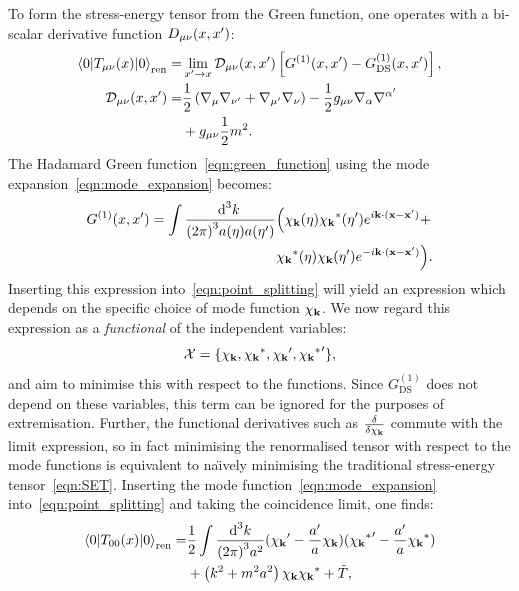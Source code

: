 To form the stress-energy tensor from the Green function, one operates with a bi-scalar derivative function $D_{\mu\nu}(x,\prm{x})$:
\begin{align}
  \bracket{0}{T_{\mu\nu}(x)}{0}_\mathrm{ren} =& \lim\limits_{\prm{x}\to x} \mathcal{D}_{\mu\nu}(x,\prm{x}) \left[ G^{(1)}(x,\prm{x}) - G^{(1)}_\mathrm{DS}(x,\prm{x}) \right],
  \label{eqn:point_splitting}
  \\
  \mathcal{D}_{\mu\nu}(x,\prm{x})=& \frac{1}{2}\left( \nabla_{\mu}\nabla_{\prm{\nu}} + \nabla_{\prm{\mu}}\nabla_{\nu} \right) -\frac{1}{2} g_{\mu\nu} \nabla_\alpha \nabla^{\prm{\alpha}} \nonumber\\
  &+ g_{\mu\nu} \frac{1}{2}m^2.  \nonumber
\end{align}
The Hadamard Green function~\eqref{eqn:green_function} using the mode expansion~\eqref{eqn:mode_expansion} becomes:
\begin{align}
  G^{(1)}(x,\prm{x}) = 
  \int\frac{\d[3]{k}\:}{{(2\pi)}^3a(\eta)a(\prm{\eta})}&
  \Big(
  \chi_\vk(\eta)
  \str{\chi_{\vk}}(\prm{\eta})e^{i\vk\cdot(\vx-\prm{\vx})}+\nonumber\\
  &
  \str{\chi_\vk}(\eta)
  \chi_{\vk}(\prm{\eta})e^{-i\vk\cdot(\vx-\prm{\vx})}
  \Big).
  \nonumber
\end{align}
Inserting this expression into~\eqref{eqn:point_splitting} will yield an expression which depends on the specific choice of mode function $\chi_\vk$. We now regard this expression as a {\em functional\/} of the independent variables:
\begin{equation}
  \mathcal{X} = \{\chi_\vk,\str{\chi_\vk},\prm{\chi_\vk},\prm{\str{\chi_\vk}}\},
  \label{eqn:vars}
\end{equation}
and aim to minimise this with respect to the functions. Since $G^{(1)}_{\mathrm{DS}}$ does not depend on these variables, this term can be ignored for the purposes of extremisation. Further, the functional derivatives such as $\frac{\delta}{\delta \chi_\vk}$ commute with the limit expression, so in fact minimising the renormalised tensor with respect to the mode functions is equivalent to na\"{\i}vely minimising the traditional stress-energy tensor~\eqref{eqn:SET}. Inserting the mode function~\eqref{eqn:mode_expansion} into~\eqref{eqn:point_splitting} and taking the coincidence limit, one finds:
\begin{align}
  \bracket{0}{T_{00}(x)}{0}_\mathrm{ren} = &\frac{1}{2}\int \frac{\d[3]{k}}{{(2\pi)}^3 a^2} (\prm{\chi_\vk}-\frac{\prm{a}}{a}\chi_\vk)(\prm{\str{\chi_\vk}}-\frac{\prm{a}}{a}\str{\chi_\vk})
  \nonumber \\
  &+\left( k^2 + m^2a^2 \right)\chi_\vk {\chi_\vk}^\ast + \tilde{T},
\end{align}
